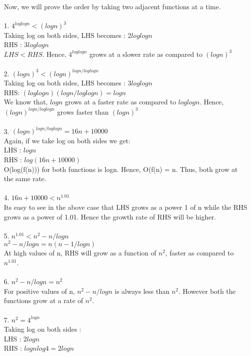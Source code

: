 \documentclass[10pt]{article}
\begin{document}
Now, we will prove the order by taking two adjacent functions at a time.\\\\
1. $4^{loglogn} < (logn)^3 $\\
Taking log on both sides, LHS becomes : $2loglogn$\\ 
RHS : $3loglogn$\\
$LHS < RHS$. Hence, $4^{loglogn} $ grows at a slower rate as compared to $ (logn)^3 $
\\\\
2. $(logn)^3 < (logn)^{logn/loglogn}$\\
Taking log on both sides, LHS becomes : $3loglogn$\\
RHS: $(loglogn)(logn/loglogn) = logn$\\
We know that, $logn$ grows at a faster rate as compared to $loglogn$. Hence, $(logn)^{logn/loglogn}$ grows faster than $(logn)^3$
\\\\
3. $(logn)^{logn/loglogn} = 16n + 10000$\\
Again, if we take log on both sides we get:\\
LHS : $logn$\\
RHS : $log(16n + 10000)$\\
O(log(f(n))) for both functions is logn. Hence, O(f(n) = n. Thus, both grow at the same rate.
\\\\
4. $16n+10000 < n^{1.01}$\\
Its easy to see in the above case that LHS grows as a power 1 of n while the RHS grows as a power of 1.01. Hence the growth rate of RHS will be higher.
\\\\
5. $n^{1.01} < n^2 - n/logn$\\
$n^2 - n/logn = n(n - 1/logn)$\\
At high values of n, RHS will grow as a function of $n^2$, faster as compared to $n^{1.01}$.
\\\\
6. $n^2 - n/logn = n^2$\\
For positive values of n, $n^2 - n/logn$ is always less than $n^2$. However both the functions grow at a rate of $n^2$.
\\\\
7. $n^2 = 4^{logn}$\\
Taking log on both sides :\\ 
LHS : $2logn$\\
RHS : $lognlog4 = 2logn$\\
\end{document}

